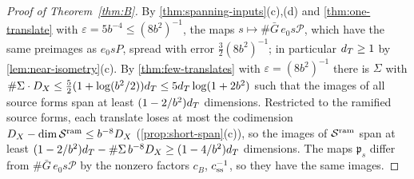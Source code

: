 \begin{proof}[Proof of Theorem~\textup{\ref{thm:B}}]
By \cref{thm:spanning-inputs}(c),(d) and \cref{thm:one-translate} with $\varepsilon=5b^{-4}\le(8b^2)^{-1}$, the maps $s\mapsto\#\bar G\,e_0s\mathcal P$, which have the same preimages as
$e_0sP$, spread with error $\frac32(8b^2)^{-1}$; in particular $d_T\ge1$ by \cref{lem:near-isometry}(c). By \cref{thm:few-translates} with $\varepsilon=(8b^2)^{-1}$ there is $\Sigma$ with
$\#\Sigma\cdot D_X\le\frac52(1+\log(b^2/2))d_T\le5d_T\log(1+2b^2)$ such that the images of all source forms span at least $(1-2/b^2)d_T$ dimensions. Restricted to the
ramified source forms, each translate loses at most the codimension $D_X-\dim\mathcal S^{\rm ram}\le b^{-8}D_X$ (\cref{prop:short-span}(c)), so the images of $\mathcal S^{\rm ram}$ span
at least $(1-2/b^2)d_T-\#\Sigma\,b^{-8}D_X\ge(1-4/b^2)d_T$ dimensions. The maps $\mathfrak p_s$ differ from $\#\bar G\,e_0s\mathcal P$ by the nonzero factors $c_B$, $c_{\rm ss}^{-1}$, so
they have the same images.
\end{proof}

